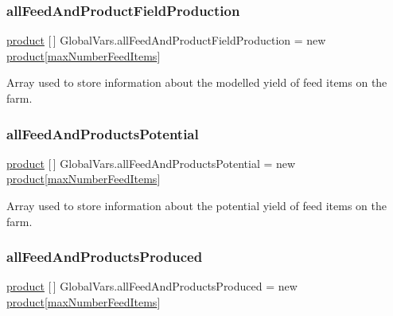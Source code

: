 \mbox{\label{class_global_vars_aa1c5d78bdc0b4d2f03b806a5008b94cd}} 
\subsubsection{\texorpdfstring{allFeedAndProductFieldProduction}{allFeedAndProductFieldProduction}}
{\footnotesize\ttfamily \mbox{\hyperlink{class_global_vars_1_1product}{product}} \mbox{[}$\,$\mbox{]} Global\+Vars.\+all\+Feed\+And\+Product\+Field\+Production = new \mbox{\hyperlink{class_global_vars_1_1product}{product}}\mbox{[}\mbox{\hyperlink{class_global_vars_a42fa58d4be2a863e36b4ec8e8bee69cd}{max\+Number\+Feed\+Items}}\mbox{]}}



Array used to store information about the modelled yield of feed items on the farm. 

\mbox{\label{class_global_vars_a382e4d64f254414a5db46b6ddc77ee8d}} 
\subsubsection{\texorpdfstring{allFeedAndProductsPotential}{allFeedAndProductsPotential}}
{\footnotesize\ttfamily \mbox{\hyperlink{class_global_vars_1_1product}{product}} \mbox{[}$\,$\mbox{]} Global\+Vars.\+all\+Feed\+And\+Products\+Potential = new \mbox{\hyperlink{class_global_vars_1_1product}{product}}\mbox{[}\mbox{\hyperlink{class_global_vars_a42fa58d4be2a863e36b4ec8e8bee69cd}{max\+Number\+Feed\+Items}}\mbox{]}}



Array used to store information about the potential yield of feed items on the farm. 

\mbox{\label{class_global_vars_a9e40d65b9f8ceb4cca1620a3acb63efb}} 
\subsubsection{\texorpdfstring{allFeedAndProductsProduced}{allFeedAndProductsProduced}}
{\footnotesize\ttfamily \mbox{\hyperlink{class_global_vars_1_1product}{product}} \mbox{[}$\,$\mbox{]} Global\+Vars.\+all\+Feed\+And\+Products\+Produced = new \mbox{\hyperlink{class_global_vars_1_1product}{product}}\mbox{[}\mbox{\hyperlink{class_global_vars_a42fa58d4be2a863e36b4ec8e8bee69cd}{max\+Number\+Feed\+Items}}\mbox{]}}



